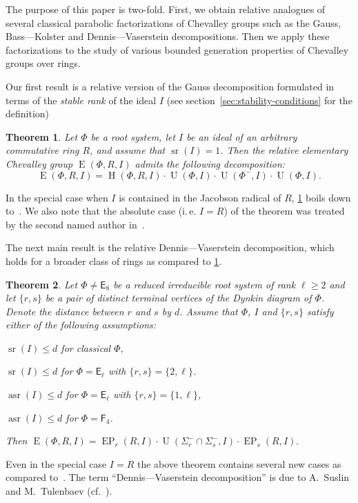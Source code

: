 \documentclass[oneside, 12pt]{amsart}
\theoremstyle{plain}
\newtheorem{thm}{Theorem}
\numberwithin{equation}{section}
\numberwithin{lemma}{section}
\theoremstyle{definition}
\theoremstyle{remark}
\DeclareMathOperator{\E}{E}
\DeclareMathOperator{\EP}{EP}
\DeclareMathOperator{\Hh}{H}
\DeclareMathOperator{\U}{U}
\DeclareMathOperator{\sr}{sr}
\DeclareMathOperator{\asr}{asr}
\newcommand{\rE}{\mathsf{E}}
\newcommand{\rF}{\mathsf{F}}
\begin{document}
The purpose of this paper is two-fold. 
First, we obtain relative analogues of several classical parabolic factorizations of Chevalley groups such as the Gauss, Bass---Kolster and Dennis---Vaserstein decompositions.
Then we apply these factorizations to the study of various bounded generation properties of Chevalley groups over rings.

Our first result is a relative version of the Gauss decomposition formulated in terms of the \emph{stable rank} of the ideal $I$ (see section~\ref{sec:stability-conditions} for the definition)
\begin{thm}\label{thm:srRI1}
Let $\Phi$ be a root system, let $I$ be an ideal of an arbitrary commutative ring $R$, and assume that $\sr(I)=1$.
Then the relative elementary Chevalley group $\E(\Phi, R, I)$ admits the following decomposition:
\[ \E(\Phi, R, I) = \Hh(\Phi, R, I) \cdot \U(\Phi, I) \cdot \U(\Phi^-, I) \cdot \U(\Phi, I). \]
\end{thm}
In the special case when $I$ is contained in the Jacobson radical of $R$, \cref{thm:srRI1} boils down to~\cite[Proposition~2.3]{Abe76}. 
We also note that the absolute case (i.\,e. $I=R$) of the theorem was treated by the second named author in~\cite{Sm12}.

The next main result is the relative Dennis---Vaserstein decomposition, which holds for a broader class of rings as compared to \cref{thm:srRI1}.
\begin{thm}\label{thm:DennisVaserstein}
Let $\Phi \neq \rE_8$ be a reduced irreducible root system of rank $\ell\geq 2$ and let $\{ r, s \}$ be a pair of distinct terminal vertices of the Dynkin diagram of $\Phi$. Denote the distance between $r$ and $s$ by $d$.
Assume that $\Phi$, $I$ and $\{r, s\}$ satisfy either of the following assumptions:
\begin{thmlist}
 \item $\sr(I) \leqslant d$ for classical $\Phi$,
 \item $\sr(I) \leqslant d$ for $\Phi=\rE_\ell$ with $\{r, s\} = \{ 2, \ell \}$.
 \item $\asr(I) \leqslant d$ for $\Phi=\rE_\ell$ with $\{r, s\} = \{1, \ell \}$,
 \item $\asr(I) \leqslant d$ for $\Phi=\rF_4$.
\end{thmlist}
Then $\E(\Phi, R, I) = \EP_r(R, I) \cdot \U(\Sigma^-_r \cap \Sigma^-_s, I) \cdot \EP_s(R, I).$ \end{thm}
Even in the special case $I=R$ the above theorem contains several new cases as compared to~\cite[Theorems~2.5 and~4.1]{St78}.
The term ``Dennis---Vaserstein decomposition'' is due to A.~Suslin and M.~Tulenbaev (cf.~\cite[Lemma~2.1]{ST76}).
\end{document}
